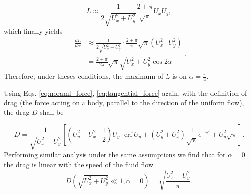 \begin{equation}
L\approx \frac{1}{2\sqrt{U_{x}^{2} +U_{y}^{2}}}\frac{2+\pi }{\sqrt{\pi }} U_{x} U_{y}
,
\end{equation}
which finally yields
\begin{equation*}
\begin{aligned}
\frac{dL}{d\alpha } & \approx \frac{1}{2\sqrt{U_{x}^{2} +U_{y}^{2}}} \cdot \frac{2+\pi }{\pi }\sqrt{\pi }\left( U_{x}^{2}\mathrm{-} U_{y}^{2}\right)\\
 & =\frac{2+\pi }{2\pi }\sqrt{\pi }\sqrt{U_{x}^{2} +U_{y}^{2}}\cos 2\alpha
\end{aligned}
.
\end{equation*}
Therefore, under theses conditions, the maximum of $L$ is on $\alpha = \frac{\pi}{4}$.

Using Eqs. \ref{eq:noraml_force}, \ref{eq:tangential_force} again, with the definition of drag (the force acting on a body, parallel to the direction of the uniform flow), the drag $D$ shall be

\begin{equation}\label{eq:drag}
D=\frac{1}{\sqrt{U_{x}^{2} +U_{y}^{2}}}\left[\left( U_{y}^{2} +U_{x}^{2}\mathrm{+}\frac{\mathrm{1}}{2}\right) U_{y} \cdotp \mathrm{erf} \ U_{y} +\left( U_{y}^{2} +U_{x}^{2}\right)\frac{1}{\mathrm{\sqrt{\pi }}} e^{-v^{2}} +U_{y}^{2}\sqrt{\pi }\right]
.
\end{equation}
Performing similar analysis under the same assumptions we find that for $\alpha=0$ the drag is linear with the speed of the fluid flow
\begin{equation}
    D \left( \sqrt{U_x^2 + U_y^2} \ll 1 , \alpha=0 \right)
    =
    \sqrt{\frac{U_x^2 + U_y^2}{\pi}}
.
\end{equation}

